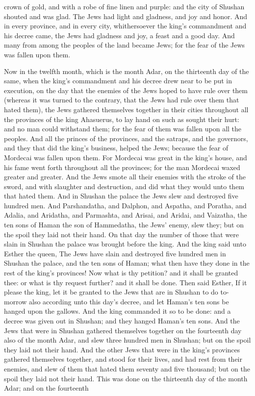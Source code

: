 crown of gold, and with a robe of fine linen and purple: and the city of Shushan shouted and was glad. The Jews had light and gladness, and joy and honor. And in every province, and in every city, whithersoever the king’s commandment and his decree came, the Jews had gladness and joy, a feast and a good day. And many from among the peoples of the land became Jews; for the fear of the Jews was fallen upon them. 

Now in the twelfth month, which is the month Adar, on the thirteenth day of the same, when the king’s commandment and his decree drew near to be put in execution, on the day that the enemies of the Jews hoped to have rule over them (whereas it was turned to the contrary, that the Jews had rule over them that hated them), the Jews gathered themselves together in their cities throughout all the provinces of the king Ahasuerus, to lay hand on such as sought their hurt: and no man could withstand them; for the fear of them was fallen upon all the peoples. And all the princes of the provinces, and the satraps, and the governors, and they that did the king’s business, helped the Jews; because the fear of Mordecai was fallen upon them. For Mordecai was great in the king’s house, and his fame went forth throughout all the provinces; for the man Mordecai waxed greater and greater. And the Jews smote all their enemies with the stroke of the sword, and with slaughter and destruction, and did what they would unto them that hated them. And in Shushan the palace the Jews slew and destroyed five hundred men. And Parshandatha, and Dalphon, and Aspatha, and Poratha, and Adalia, and Aridatha, and Parmashta, and Arisai, and Aridai, and Vaizatha, the ten sons of Haman the son of Hammedatha, the Jews’ enemy, slew they; but on the spoil they laid not their hand.  On that day the number of those that were slain in Shushan the palace was brought before the king. And the king said unto Esther the queen, The Jews have slain and destroyed five hundred men in Shushan the palace, and the ten sons of Haman; what then have they done in the rest of the king’s provinces! Now what is thy petition? and it shall be granted thee: or what is thy request further? and it shall be done. Then said Esther, If it please the king, let it be granted to the Jews that are in Shushan to do to-morrow also according unto this day’s decree, and let Haman’s ten sons be hanged upon the gallows. And the king commanded it so to be done: and a decree was given out in Shushan; and they hanged Haman’s ten sons. And the Jews that were in Shushan gathered themselves together on the fourteenth day also of the month Adar, and slew three hundred men in Shushan; but on the spoil they laid not their hand. And the other Jews that were in the king’s provinces gathered themselves together, and stood for their lives, and had rest from their enemies, and slew of them that hated them seventy and five thousand; but on the spoil they laid not their hand.  This was done on the thirteenth day of the month Adar; and on the fourteenth 